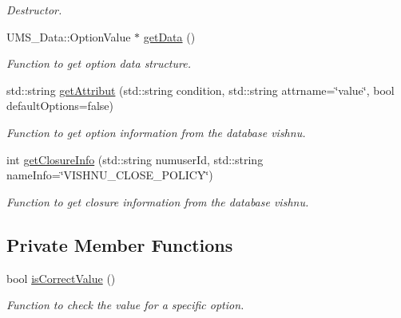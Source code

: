 \begin{DoxyCompactItemize}
\begin{DoxyCompactList}\small\item\em Destructor. \item\end{DoxyCompactList}\item 
UMS\_\-Data::OptionValue $\ast$ \hyperlink{classOptionValueServer_a9d40a465b4c6c048d49dd121cbbcb4c4}{getData} ()
\begin{DoxyCompactList}\small\item\em Function to get option data structure. \item\end{DoxyCompactList}\item 
std::string \hyperlink{classOptionValueServer_a9be8cdef4ed59ef0fdf421bb973257d0}{getAttribut} (std::string condition, std::string attrname=\char`\"{}value\char`\"{}, bool defaultOptions=false)
\begin{DoxyCompactList}\small\item\em Function to get option information from the database vishnu. \item\end{DoxyCompactList}\item 
int \hyperlink{classOptionValueServer_a156098735b4d0ce3a23de69278d40d6a}{getClosureInfo} (std::string numuserId, std::string nameInfo=\char`\"{}VISHNU\_\-CLOSE\_\-POLICY\char`\"{})
\begin{DoxyCompactList}\small\item\em Function to get closure information from the database vishnu. \item\end{DoxyCompactList}\end{DoxyCompactItemize}
\subsection*{Private Member Functions}
\begin{DoxyCompactItemize}
\item 
bool \hyperlink{classOptionValueServer_aa9d00391ec222d6f200c7ea1db8a4892}{isCorrectValue} ()
\begin{DoxyCompactList}\small\item\em Function to check the value for a specific option. \item\end{DoxyCompactList}\end{DoxyCompactItemize}
